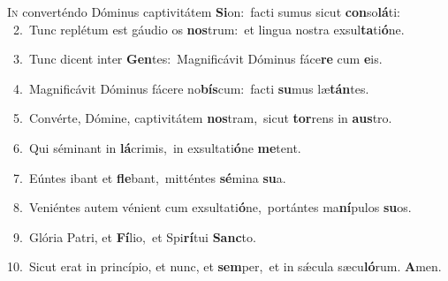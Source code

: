\lettrine{\initial\textcolor{\initialcolor}{I}}{n} converténdo Dóminus captivitátem \textbf{Si}\-on:~\star facti sumus sicut \textbf{con}\-so\-\textbf{lá}\-ti:\\
{\numbfont\textcolor{\numbcolor}{~2.}}~Tunc replétum est gáudio os \textbf{nos}\-trum:~\star et lingua nostra exsul\-\textbf{ta}\-ti\-\textbf{ó}\-ne.\par
{\numbfont\textcolor{\numbcolor}{~3.}}~Tunc dicent inter \textbf{Gen}\-tes:~\star Magnificávit Dóminus fáce\textbf{re} cum \textbf{e}\-is.\par
{\numbfont\textcolor{\numbcolor}{~4.}}~Magnificávit Dóminus fácere no\-\textbf{bís}\-cum:~\star facti \textbf{su}\-mus læ\-\textbf{tán}\-tes.\par
{\numbfont\textcolor{\numbcolor}{~5.}}~Convérte, Dómine, captivitátem \textbf{nos}\-tram,~\star sicut \textbf{tor}\-rens in \textbf{aus}\-tro.\par
{\numbfont\textcolor{\numbcolor}{~6.}}~Qui séminant in \textbf{lá}\-crimis,~\star in exsultati\-\textbf{ó}\-ne \textbf{me}\-tent.\par
{\numbfont\textcolor{\numbcolor}{~7.}}~Eúntes ibant et \textbf{fle}\-bant,~\star mitténtes \textbf{sé}\-mina \textbf{su}\-a.\par
{\numbfont\textcolor{\numbcolor}{~8.}}~Veniéntes autem vénient cum exsultati\-\textbf{ó}\-ne,~\star portántes ma\-\textbf{ní}\-pulos \textbf{su}\-os.\par
{\numbfont\textcolor{\numbcolor}{~9.}}~Glória Patri, et \textbf{Fí}\-lio,~\star et Spi\-\textbf{rí}\-tui \textbf{Sanc}\-to.\par
{\numbfont\textcolor{\numbcolor}{10.}}~Sicut erat in princípio, et nunc, et \textbf{sem}\-per,~\star et in sǽcula sæcu\-\textbf{ló}\-rum. \textbf{A}\-men.\par
